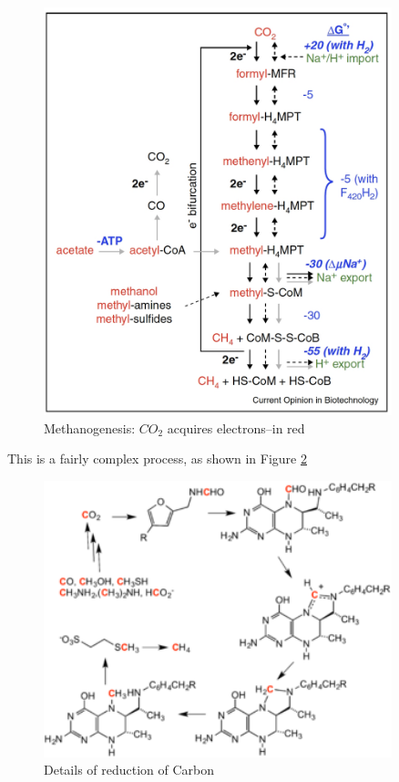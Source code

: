 \documentclass[]{article}
\begin{document}
\begin{figure}[H]
	\caption[Methanogenesis]{Methanogenesis: $CO_2$ acquires electrons--in red\cite{costa2014metabolic}} \label{fig:Methanogenesis} 
	\includegraphics[width=0.9\textwidth]{Methanogenesis}
\end{figure}

This is a fairly complex process, as shown in Figure \ref{fig:320px-Methanogenesis_cycle}
\begin{figure}[H]
	\caption[Details of reduction of Carbon]{Details of reduction of Carbon\cite{costa2014metabolic}} \label{fig:320px-Methanogenesis_cycle} 
	\includegraphics[width=0.9\textwidth]{320px-Methanogenesis_cycle}
\end{figure}
\end{document}
